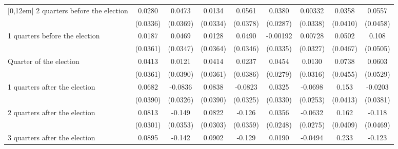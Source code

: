 \begin{table}[!ht]
\begin{tabular}{l*{8}{c}}
[0,12em]
 2 quarters before the election&      0.0280         &      0.0473         &      0.0134         &      0.0561         &      0.0380         &     0.00332         &      0.0358         &      0.0557         \\
                    &    (0.0336)         &    (0.0369)         &    (0.0334)         &    (0.0378)         &    (0.0287)         &    (0.0338)         &    (0.0410)         &    (0.0458)         \\
[0,12em]
 1 quarters before the election&      0.0187         &      0.0469         &      0.0128         &      0.0490         &    -0.00192         &     0.00728         &      0.0502         &       0.108\sym{*}  \\
                    &    (0.0361)         &    (0.0347)         &    (0.0364)         &    (0.0346)         &    (0.0335)         &    (0.0327)         &    (0.0467)         &    (0.0505)         \\
[0,12em]
Quarter of the election&      0.0413         &      0.0121         &      0.0414         &      0.0237         &      0.0454         &      0.0130         &      0.0738         &      0.0603         \\
                    &    (0.0361)         &    (0.0390)         &    (0.0361)         &    (0.0386)         &    (0.0279)         &    (0.0316)         &    (0.0455)         &    (0.0529)         \\
[0,12em]
 1 quarters after the election&      0.0682         &     -0.0836\sym{*}  &      0.0838\sym{*}  &     -0.0823\sym{*}  &      0.0325         &     -0.0698\sym{**} &       0.153\sym{***}&     -0.0203         \\
                    &    (0.0390)         &    (0.0326)         &    (0.0390)         &    (0.0325)         &    (0.0330)         &    (0.0253)         &    (0.0413)         &    (0.0381)         \\
[0,12em]
 2 quarters after the election&      0.0813\sym{**} &      -0.149\sym{***}&      0.0822\sym{**} &      -0.126\sym{***}&      0.0356         &     -0.0632\sym{*}  &       0.162\sym{***}&      -0.118\sym{*}  \\
                    &    (0.0301)         &    (0.0353)         &    (0.0303)         &    (0.0359)         &    (0.0248)         &    (0.0275)         &    (0.0409)         &    (0.0469)         \\
[0,12em]
 3 quarters after the election&      0.0895\sym{**} &      -0.142\sym{***}&      0.0902\sym{**} &      -0.129\sym{***}&      0.0190         &     -0.0494         &       0.233\sym{***}&      -0.123\sym{**} \\

\end{tabular}
\end{table}
